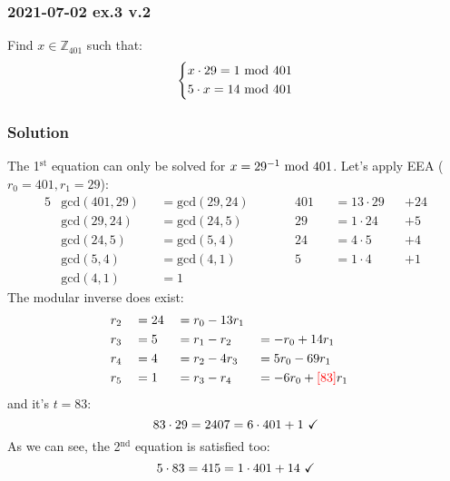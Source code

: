 \newpage
\subsubsection{2021-07-02 ex.3 v.2}
Find $x\in\mathbb{Z}_{401}$ such that:
\begin{equation*}
  \left\{
    \begin{aligned}
      & x\cdot29=1\text{ mod }401 \\
      & 5\cdot x=14\text{ mod }401
    \end{aligned}
  \right.
\end{equation*}
\subsubsection*{Solution}
The 1$^\text{st}$ equation can only be solved for $x=29^{-1}\text{ mod }401$. Let's apply EEA ($r_0=401, r_1=29$):
\begin{alignat*}{5}
    &\text{gcd}(401,29)&&=\text{gcd}(29,24)\qquad&&401&&=13\cdot29&&+24\\
    &\text{gcd}(29,24)&&=\text{gcd}(24,5)\qquad&&29&&=1\cdot24&&+5\\
    &\text{gcd}(24,5)&&=\text{gcd}(5,4)\qquad&&24&&=4\cdot5&&+4\\
    &\text{gcd}(5,4)&&=\text{gcd}(4,1)\qquad&&5&&=1\cdot4&&+1\\
    &\text{gcd}(4,1)&&=1
\end{alignat*}
The modular inverse does exist:
\begin{alignat*}{4}
    &r_2&&=24&&=r_0-13r_1\\
    &r_3&&=5&&=r_1-r_2&&=-r_0+14r_1\\
    &r_4&&=4&&=r_2-4r_3&&=5r_0-69r_1\\
    &r_5&&=1&&=r_3-r_4&&=-6r_0+\textcolor{red}{[83]}r_1
\end{alignat*}
and it's $t=83$:
$$83\cdot29=2407=6\cdot401+1\text{ \checkmark}$$
As we can see, the 2$^\text{nd}$ equation is satisfied too:
$$5\cdot83=415=1\cdot401+14\text{ \checkmark}$$

